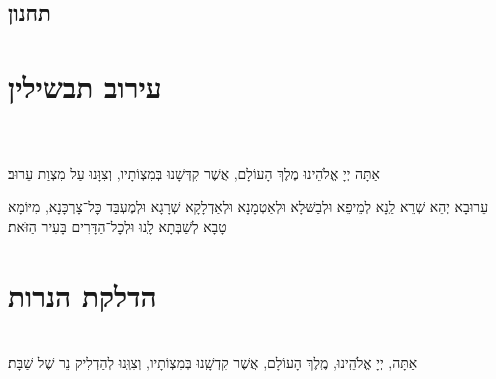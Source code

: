 \documentclass[twoside, openany, parskip=half, 11pt]{book}
\begin{document}

\avinumalkeinu

\vfill
{}\\

\section[תחנון]{ תחנון }


\nefilasapayim

\shomeryisroel

\fullkaddish

\label{mincha aleinu}

\aleinu
\mournerskaddish

\vfill

\quad{}\quad{}

\chapter[עירוב תבשילין]{ עירוב תבשילין }

\\
\\
אַתָּה יְיָ אֱלֹהֵינוּ מֶלֶךְ הָעוֹלָם, אֲשֶׁר קִדְּשָׁנוּ בְּמִצְוֹתָיו, וְצִוָּנוּ עַל מִצְוַת עֵרוּב׃

עֵרוּבָא יְהֵא שְׁרֵא לַֽנָא לְמֵיפֵא וּלְבַשּּׁלָא וּלְאַטְמָנָא וּלְאַדְלָקָא שְׁרָגָא וּלְמֶעְבַּד כׇּל־צָרְכָּנָא, מִיּוֹמָא טָבָא לְשַׁבְּתָא לָֽנוּ וּלְכׇל־הַדָּרִים בָּעִיר הַזּׂאת׃‏


\vspace{\baselineskip}

\chapter[הדלקת הנרות שבת ויו״ט]{ הדלקת הנרות }

\\
אַתָּה, יְיָ אֱלֹהֵֽינוּ, מֶֽלֶךְ הָעוֹלָם, אֲשֶׁר קִדְשָֽׁנוּ בְּמִצְוֹתָיו, וְצִוְּֽנוּ לְהַדְלִיק נֵר שֶׁל שַׁבָּת׃
\end{document}
